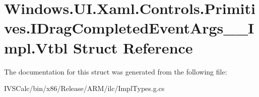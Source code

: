 \hypertarget{struct_windows_1_1_u_i_1_1_xaml_1_1_controls_1_1_primitives_1_1_i_drag_completed_event_args_____impl_1_1_vtbl}{}\section{Windows.\+U\+I.\+Xaml.\+Controls.\+Primitives.\+I\+Drag\+Completed\+Event\+Args\+\_\+\+\_\+\+Impl.\+Vtbl Struct Reference}
\label{struct_windows_1_1_u_i_1_1_xaml_1_1_controls_1_1_primitives_1_1_i_drag_completed_event_args_____impl_1_1_vtbl}


The documentation for this struct was generated from the following file\+:\begin{DoxyCompactItemize}
\item 
I\+V\+S\+Calc/bin/x86/\+Release/\+A\+R\+M/ilc/Impl\+Types.\+g.\+cs\end{DoxyCompactItemize}
